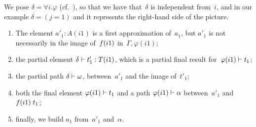 We pose $\delta = \forall i.\varphi$ (cf.\ ), so
that we have that~$\delta$ is independent from~$i$, and in our example
$\delta = (j = 1)$ and it represents the right-hand side of the
picture.
\begin{enumerate}
\item The element $a'_1:A(i1)$ is a first approximation of~$a_1$, but
  $a'_1$ is not necessarily in the image of~$f{}(i1)$
  in~$\Gamma,\varphi(i1)$;
\item the partial element $\delta\vdash t'_1:T(i1)$, which is a
  partial final result for~$\varphi(i1)\vdash t_1$;
\item the partial path $\delta\vdash\omega$, between~$a'_1$ and
  the image of~$t'_1$;
\item both the final element $\varphi(i1)\vdash t_1$ and a path
  $\varphi(i1)\vdash\alpha$ between~$a'_1$ and
  $f{}(i1) \; t_1$;
\item finally, we build $a_1$ from~$a'_1$ and~$\alpha$.
\end{enumerate}
%
